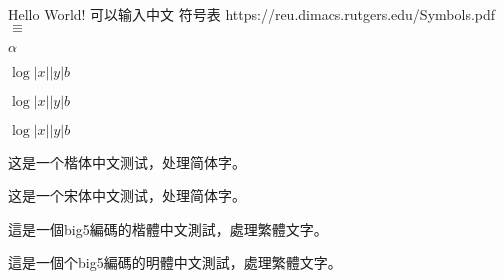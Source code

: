 \documentclass{article}
\begin{document}
\begin{CJK}{UTF8}{gbsn}
  Hello World!
  可以输入中文
  符号表  https://reu.dimacs.rutgers.edu/Symbols.pdf
  $\equiv$

  $\alpha$

  $  \log|x||y|b $

  $  \log\left|x\right|\left|y\right|b $

  $  \log\mathopen|x\mathclose|\mathopen|y\mathclose|b $
\end{CJK}


\begin{CJK}{UTF8}{gkai}  
这是一个楷体中文测试，处理简体字。  
\end{CJK}  
\begin{CJK}{UTF8}{gbsn}  
这是一个宋体中文测试，处理简体字。  
\end{CJK}  
\begin{CJK}{UTF8}{bkai}  
這是一個big5編碼的楷體中文測試，處理繁體文字。  
\end{CJK}  
\begin{CJK}{UTF8}{bsmi}  
這是一個个big5編碼的明體中文測試，處理繁體文字。  
\end{CJK}  
\end{document}
